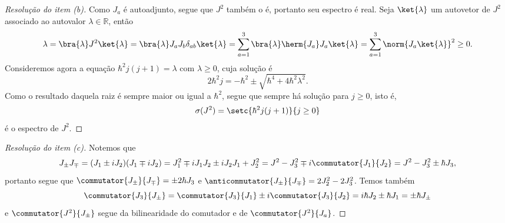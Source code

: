 \begin{proof}[Resolução do item (b)]
    Como \(J_a\) é autoadjunto, segue que \(J^2\) também o é, portanto seu espectro é real. Seja \(\ket{\lambda}\) um autovetor de \(J^2\) associado ao autovalor \(\lambda \in \mathbb{R}\), então
    \begin{equation*}
        \lambda = \bra{\lambda}J^2\ket{\lambda} = \bra{\lambda}J_a J_b \delta_{ab} \ket{\lambda} = \sum_{a = 1}^3 \bra{\lambda} \herm{J_a}J_a \ket{\lambda} = \sum_{a = 1}^3 \norm{J_a\ket{\lambda}}^2 \geq 0.
    \end{equation*}
    Consideremos agora a equação \(\hbar^2j(j+1) = \lambda\) com \(\lambda \geq 0\), cuja solução é
    \begin{equation*}
        2 \hbar^2 j = -\hbar^2 \pm \sqrt{\hbar^4 + 4 \hbar^2\lambda^2}.
    \end{equation*}
    Como o resultado daquela raiz é sempre maior ou igual a \(\hbar^2\), segue que sempre há solução para \(j \geq 0\), isto é,
    \begin{equation*}
        \sigma(J^2) = \setc{\hbar^2 j (j + 1)}{j \geq 0}
    \end{equation*}
    é o espectro de \(J^2\).
\end{proof}
\begin{proof}[Resolução do item (c)]
    Notemos que
    \begin{equation*}
        J_\pm J_\mp = (J_1 \pm i J_2)(J_1 \mp i J_2) = J_1^2 \mp i J_1 J_2 \pm i J_2 J_1 + J_2^2 = J^2 - J_3^2 \mp i \commutator{J_1}{J_2} = J^2 - J_3^2 \pm \hbar J_3,
    \end{equation*}
    portanto segue que \(\commutator{J_\pm}{J_\mp} = \pm2\hbar J_3\) e \(\anticommutator{J_\pm}{J_\mp} = 2J_2^2 - 2J_3^2\). Temos também
    \begin{equation*}
        \commutator{J_3}{J_\pm} = \commutator{J_3}{J_1} \pm i \commutator{J_3}{J_2} = i \hbar J_2 \pm \hbar J_1 = \pm \hbar J_\pm
    \end{equation*}
    e \(\commutator{J^2}{J_\pm}\) segue da bilinearidade do comutador e de \(\commutator{J^2}{J_a}\).
\end{proof}
